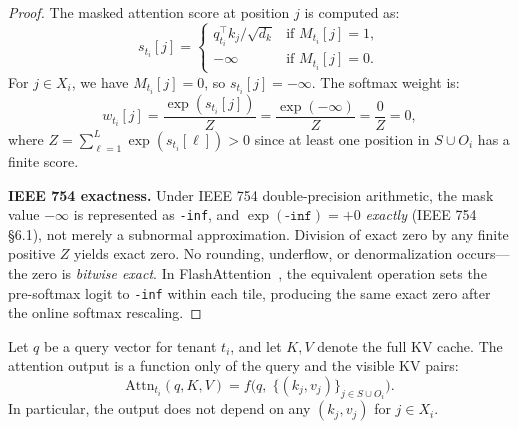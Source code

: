 \begin{proof}
The masked attention score at position $j$ is computed as:
\begin{equation}
    s_{t_i}[j] = \begin{cases}
        q_{t_i}^\top k_j / \sqrt{d_k} & \text{if } M_{t_i}[j] = 1, \\
        -\infty & \text{if } M_{t_i}[j] = 0.
    \end{cases}
\end{equation}
For $j \in X_i$, we have $M_{t_i}[j] = 0$, so $s_{t_i}[j] = -\infty$.
The softmax weight is:
\begin{equation}
    w_{t_i}[j] = \frac{\exp(s_{t_i}[j])}{Z} = \frac{\exp(-\infty)}{Z} = \frac{0}{Z} = 0,
\end{equation}
where $Z = \sum_{\ell=1}^{L} \exp(s_{t_i}[\ell]) > 0$ since at least one position
in $S \cup O_i$ has a finite score.

\medskip
\noindent\textbf{IEEE 754 exactness.}
Under IEEE 754 double-precision arithmetic, the mask value $-\infty$ is represented as
\texttt{-inf}, and $\exp(\texttt{-inf}) = +0$ \emph{exactly} (IEEE 754 \S6.1), not merely
a subnormal approximation. Division of exact zero by any finite positive $Z$ yields exact
zero. No rounding, underflow, or denormalization occurs---the zero is \emph{bitwise exact}.
In FlashAttention~\cite{dao2022flashattention}, the equivalent operation sets the
pre-softmax logit to \texttt{-inf} within each tile, producing the same exact zero
after the online softmax rescaling.
\end{proof}

\begin{lemma}
\label{lem:functional-independence}
Let $q$ be a query vector for tenant $t_i$, and let $K, V$ denote the full KV cache.
The attention output is a function only of the query and the visible KV pairs:
\begin{equation}
    \mathrm{Attn}_{t_i}(q, K, V) = f\!\big(q,\; \{(k_j, v_j)\}_{j \in S \cup O_i}\big).
\end{equation}
In particular, the output does not depend on any $(k_j, v_j)$ for $j \in X_i$.
\end{lemma}

